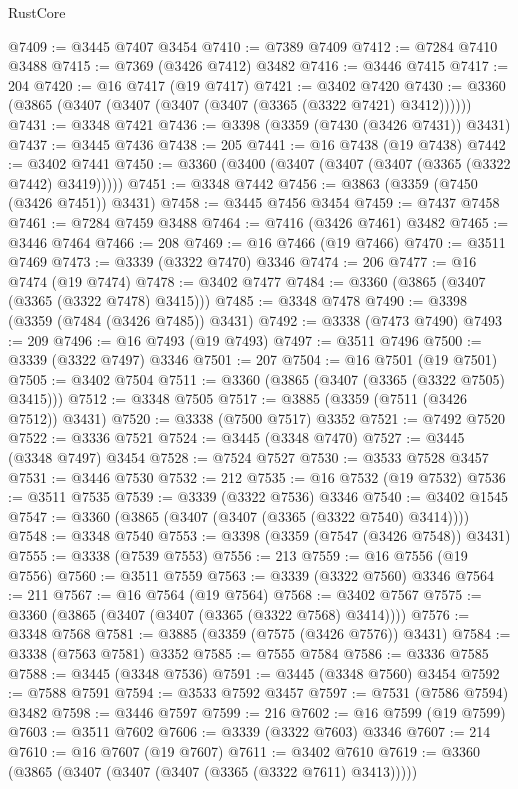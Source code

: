 \begin{lexlean}{RustCore}
\begin{coremodule}
@7409 := @3445 @7407 @3454
@7410 := @7389 @7409
@7412 := @7284 @7410 @3488
@7415 := @7369 (@3426 @7412) @3482
@7416 := @3446 @7415
@7417 := 204
@7420 := @16 @7417 (@19 @7417)
@7421 := @3402 @7420
@7430 := @3360 (@3865 (@3407 (@3407 (@3407 (@3407 (@3365 (@3322 @7421) @3412))))))
@7431 := @3348 @7421
@7436 := @3398 (@3359 (@7430 (@3426 @7431)) @3431)
@7437 := @3445 @7436
@7438 := 205
@7441 := @16 @7438 (@19 @7438)
@7442 := @3402 @7441
@7450 := @3360 (@3400 (@3407 (@3407 (@3407 (@3365 (@3322 @7442) @3419)))))
@7451 := @3348 @7442
@7456 := @3863 (@3359 (@7450 (@3426 @7451)) @3431)
@7458 := @3445 @7456 @3454
@7459 := @7437 @7458
@7461 := @7284 @7459 @3488
@7464 := @7416 (@3426 @7461) @3482
@7465 := @3446 @7464
@7466 := 208
@7469 := @16 @7466 (@19 @7466)
@7470 := @3511 @7469
@7473 := @3339 (@3322 @7470) @3346
@7474 := 206
@7477 := @16 @7474 (@19 @7474)
@7478 := @3402 @7477
@7484 := @3360 (@3865 (@3407 (@3365 (@3322 @7478) @3415)))
@7485 := @3348 @7478
@7490 := @3398 (@3359 (@7484 (@3426 @7485)) @3431)
@7492 := @3338 (@7473 @7490)
@7493 := 209
@7496 := @16 @7493 (@19 @7493)
@7497 := @3511 @7496
@7500 := @3339 (@3322 @7497) @3346
@7501 := 207
@7504 := @16 @7501 (@19 @7501)
@7505 := @3402 @7504
@7511 := @3360 (@3865 (@3407 (@3365 (@3322 @7505) @3415)))
@7512 := @3348 @7505
@7517 := @3885 (@3359 (@7511 (@3426 @7512)) @3431)
@7520 := @3338 (@7500 @7517) @3352
@7521 := @7492 @7520
@7522 := @3336 @7521
@7524 := @3445 (@3348 @7470)
@7527 := @3445 (@3348 @7497) @3454
@7528 := @7524 @7527
@7530 := @3533 @7528 @3457
@7531 := @3446 @7530
@7532 := 212
@7535 := @16 @7532 (@19 @7532)
@7536 := @3511 @7535
@7539 := @3339 (@3322 @7536) @3346
@7540 := @3402 @1545
@7547 := @3360 (@3865 (@3407 (@3407 (@3365 (@3322 @7540) @3414))))
@7548 := @3348 @7540
@7553 := @3398 (@3359 (@7547 (@3426 @7548)) @3431)
@7555 := @3338 (@7539 @7553)
@7556 := 213
@7559 := @16 @7556 (@19 @7556)
@7560 := @3511 @7559
@7563 := @3339 (@3322 @7560) @3346
@7564 := 211
@7567 := @16 @7564 (@19 @7564)
@7568 := @3402 @7567
@7575 := @3360 (@3865 (@3407 (@3407 (@3365 (@3322 @7568) @3414))))
@7576 := @3348 @7568
@7581 := @3885 (@3359 (@7575 (@3426 @7576)) @3431)
@7584 := @3338 (@7563 @7581) @3352
@7585 := @7555 @7584
@7586 := @3336 @7585
@7588 := @3445 (@3348 @7536)
@7591 := @3445 (@3348 @7560) @3454
@7592 := @7588 @7591
@7594 := @3533 @7592 @3457
@7597 := @7531 (@7586 @7594) @3482
@7598 := @3446 @7597
@7599 := 216
@7602 := @16 @7599 (@19 @7599)
@7603 := @3511 @7602
@7606 := @3339 (@3322 @7603) @3346
@7607 := 214
@7610 := @16 @7607 (@19 @7607)
@7611 := @3402 @7610
@7619 := @3360 (@3865 (@3407 (@3407 (@3407 (@3365 (@3322 @7611) @3413)))))

\end{coremodule}
\end{lexlean}
